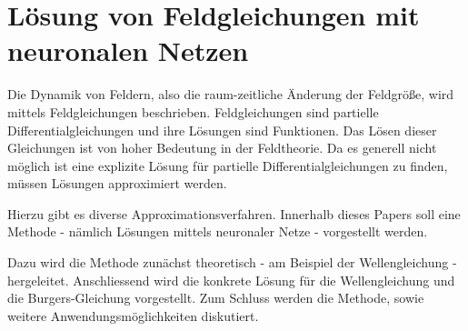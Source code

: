 %
%
%
%
\chapter{Lösung von Feldgleichungen mit neuronalen Netzen\label{chapter:neuronal}}
\begin{refsection}

Die Dynamik von Feldern, also die raum-zeitliche Änderung der Feldgröße, wird mittels Feldgleichungen beschrieben.
Feldgleichungen sind partielle Differentialgleichungen und ihre Lösungen sind Funktionen.
Das Lösen dieser Gleichungen ist von hoher Bedeutung in der Feldtheorie.
Da es generell nicht möglich ist eine explizite Lösung für partielle Differentialgleichungen zu finden, müssen Lösungen approximiert werden.

Hierzu gibt es diverse Approximationsverfahren.
Innerhalb dieses Papers soll eine Methode - nämlich Lösungen mittels neuronaler Netze - vorgestellt werden.\newline

Dazu wird die Methode zunächst theoretisch - am Beispiel der Wellengleichung - hergeleitet.
Anschliessend wird die konkrete Lösung für die Wellengleichung und die Burgers-Gleichung vorgestellt.
Zum Schluss werden die Methode, sowie weitere Anwendungsmöglichkeiten diskutiert.\newline






\printbibliography[heading=subbibliography]
\end{refsection}
